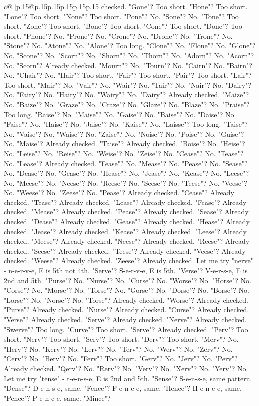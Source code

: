 \documentclass{article}
\begin{document}
{\begin{supertabular}{c@{$\;$}|p{.15\linewidth}@{}p{.15\linewidth}p{.15\linewidth}p{.15\linewidth}p{.15\linewidth}p{.15\linewidth}}
{{{checked. "Gone"? Too short. "Hone"? Too short. "Lone"? Too short. "None"? Too short. "Pone"? No. "Sone"? No. "Tone"? Too short. "Zone"? Too short. "Bone"? Too short. "Cone"? Too short. "Done"? Too short. "Phone"? No. "Prone"? No. "Crone"? No. "Drone"? No. "Trone"? No. "Stone"? No. "Atone"? No. "Alone"? Too long. "Clone"? No. "Flone"? No. "Glone"? No. "Scone"? No. "Scorn"? No. "Shorn"? No. "Thorn"? No. "Adorn"? No. "Acorn"? No. "Scorn"? Already checked. "Mourn"? No. "Tourn"? No. "Cairn"? No. "Bairn"? No. "Chair"? No. "Hair"? Too short. "Fair"? Too short. "Pair"? Too short. "Lair"? Too short. "Mair"? No. "Vair"? No. "Wair"? No. "Tair"? No. "Nair"? No. "Dairy"? No. "Fairy"? No. "Hairy"? No. "Wairy"? No. "Dairy"? Already checked. "Maize"? No. "Baize"? No. "Graze"? No. "Craze"? No. "Glaze"? No. "Blaze"? No. "Praise"? Too long. "Raise"? No. "Maise"? No. "Gaise"? No. "Baise"? No. "Daise"? No. "Faise"? No. "Haise"? No. "Jaise"? No. "Kaise"? No. "Laisse"? Too long. "Taise"? No. "Vaise"? No. "Waise"? No. "Zaise"? No. "Noise"? No. "Poise"? No. "Guise"? No. "Maise"? Already checked. "Taise"? Already checked. "Boise"? No. "Heise"? No. "Leise"? No. "Reise"? No. "Weise"? No. "Zeise"? No. "Cease"? No. "Tease"? No. "Lease"? Already checked. "Fease"? No. "Mease"? No. "Pease"? No. "Sease"? No. "Dease"? No. "Gease"? No. "Hease"? No. "Jease"? No. "Kease"? No. "Leese"? No. "Meese"? No. "Neese"? No. "Reese"? No. "Seese"? No. "Teese"? No. "Veese"? No. "Weese"? No. "Zeese"? No. "Pease"? Already checked. "Cease"? Already checked. "Tease"? Already checked. "Lease"? Already checked. "Fease"? Already checked. "Mease"? Already checked. "Pease"? Already checked. "Sease"? Already checked. "Dease"? Already checked. "Gease"? Already checked. "Hease"? Already checked. "Jease"? Already checked. "Kease"? Already checked. "Leese"? Already checked. "Meese"? Already checked. "Neese"? Already checked. "Reese"? Already checked. "Seese"? Already checked. "Teese"? Already checked. "Veese"? Already checked. "Weese"? Already checked. "Zeese"? Already checked. Let me try "nerve" {-} n{-}e{-}r{-}v{-}e, E is 5th not 4th. "Serve"? S{-}e{-}r{-}v{-}e, E is 5th. "Verse"? V{-}e{-}r{-}s{-}e, E is 2nd and 5th. "Purse"? No. "Nurse"? No. "Curse"? No. "Worse"? No. "Horse"? No. "Corse"? No. "Morse"? No. "Torse"? No. "Gorse"? No. "Dorse"? No. "Borse"? No. "Lorse"? No. "Norse"? No. "Torse"? Already checked. "Worse"? Already checked. "Purse"? Already checked. "Nurse"? Already checked. "Curse"? Already checked. "Verse"? Already checked. "Serve"? Already checked. "Nerve"? Already checked. "Swerve"? Too long. "Curve"? Too short. "Serve"? Already checked. "Perv"? Too short. "Nerv"? Too short. "Serv"? Too short. "Derv"? Too short. "Merv"? No. "Herv"? No. "Kerv"? No. "Lerv"? No. "Terv"? No. "Werv"? No. "Zerv"? No. "Cerv"? No. "Berv"? No. "Ferv"? Too short. "Gerv"? No. "Jerv"? No. "Perv"? Already checked. "Qerv"? No. "Rerv"? No. "Verv"? No. "Xerv"? No. "Yerv"? No. Let me try "tense" {-} t{-}e{-}n{-}s{-}e, E is 2nd and 5th. "Sense"? S{-}e{-}n{-}s{-}e, same pattern. "Dense"? D{-}e{-}n{-}s{-}e, same. "Fence"? F{-}e{-}n{-}c{-}e, same. "Hence"? H{-}e{-}n{-}c{-}e, same. "Pence"? P{-}e{-}n{-}c{-}e, same. "Mince"? }}}
\end{supertabular}}
\end{document}
